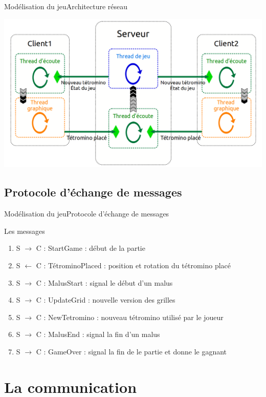 \documentclass[french]{beamer}
\begin{document}
		\begin{frame}{Modélisation du jeu}{Architecture réseau}
			\begin{center}
				\includegraphics[scale=0.25]{img/archi_reseau.png}
			\end{center}
		\end{frame}

	\subsection{Protocole d'échange de messages}

		\begin{frame}{Modélisation du jeu}{Protocole d'échange de messages}
			\begin{block}{Les messages}
				\begin{enumerate}
					\item S $\to$ C : StartGame : début de la partie
					\item S $\gets$ C : TétrominoPlaced : position et rotation du tétromino placé
					\item S $\to$ C : MalusStart : signal le début d'un malus
					\item S $\to$ C : UpdateGrid : nouvelle version des grilles
					\item S $\to$ C : NewTetromino : nouveau tétromino utilisé par le joueur
					\item S $\to$ C : MalusEnd : signal la fin d'un malus
					\item S $\to$ C : GameOver : signal la fin de le partie et donne le gagnant
				\end{enumerate}
			\end{block}
		\end{frame}

\section{La communication}
\end{document}
